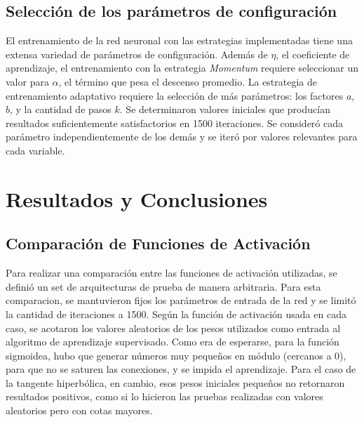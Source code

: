 \documentclass[a4paper,10pt]{article}
\begin{document}
    \subsection{Selección de los parámetros de configuración}

        \label{sec:configuracion}
        El entrenamiento de la red neuronal con las estrategias implementadas tiene una extensa variedad de parámetros de configuración. Además de $\eta$, 
        el coeficiente de aprendizaje, el entrenamiento con la estrategia \textit{Momentum} requiere seleccionar un valor para $\alpha$, el término que pesa el descenso promedio. 
        La estrategia de entrenamiento adaptativo requiere la selección de más parámetros: los factores $a$, $b$, y la cantidad de pasos $k$.
        Se determinaron valores iniciales que producían resultados suficientemente satisfactorios en 1500 iteraciones. Se consideró cada parámetro independientemente de los demás y se iteró por valores relevantes para cada variable.

\section{Resultados y Conclusiones}

    \subsection{Comparación de Funciones de Activación}
    \label{sec:comparacion-activacion}

    Para realizar una comparación entre las funciones de activación utilizadas,
    se definió un set de arquitecturas de prueba de manera arbitraria.
    Para esta comparacion, se mantuvieron fijos los parámetros de entrada de la
    red y se limitó la cantidad de iteraciones a 1500.
    Según la función de activación usada en cada caso, se acotaron los valores
    aleatorios de los pesos utilizados como entrada al algoritmo de aprendizaje
    supervisado. Como era de esperarse, para la función sigmoidea, hubo que
    generar números muy pequeños en módulo (cercanos a 0), para que no se saturen
    las conexiones, y se impida el aprendizaje.
    Para el caso de la tangente hiperbólica, en cambio, esos pesos iniciales
    pequeños no retornaron resultados positivos, como si lo hicieron las pruebas
    realizadas con valores aleatorios pero con cotas mayores.
\end{document}
